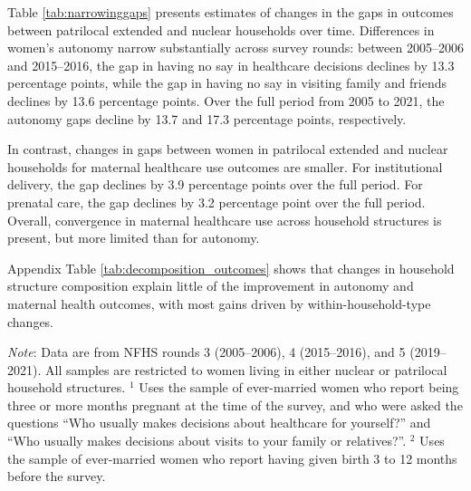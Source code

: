 \documentclass[10pt,twoside,reqno]{article}
\begin{document}
Table \ref{tab:narrowinggaps} presents estimates of changes in the gaps in outcomes between patrilocal extended and nuclear households over time.  Differences in women’s autonomy narrow substantially across survey rounds: between 2005–2006 and 2015–2016, the gap in having no say in healthcare decisions declines by 13.3 percentage points, while the gap in having no say in visiting family and friends declines by 13.6 percentage points. Over the full period from 2005 to 2021, the autonomy gaps decline by 13.7 and 17.3 percentage points, respectively.

In contrast, changes in gaps between women in patrilocal extended and nuclear households for maternal healthcare use outcomes are smaller. For institutional delivery, the gap declines by 3.9 percentage points over the full period. For prenatal care, the gap declines by 3.2 percentage point over the full period. Overall, convergence in maternal healthcare use across household structures is present, but more limited than for autonomy. 

Appendix Table \ref{tab:decomposition_outcomes} shows that changes in household structure composition explain little of the improvement in autonomy and maternal health outcomes, with most gains driven by within-household-type changes. 

\begin{table}[H]
\sansmath
\sffamily
\captionsetup{style=CAPTAB}
\caption{The gap between patrilocal extended and nuclear households in women's autonomy and healthcare use is narrowing over time}
\label{tab:narrowinggaps}
\vspace{-4pt}

\begin{scriptsize}
\setlength{\tabcolsep}{6pt}
\renewcommand{\arraystretch}{1.6}
\centering

\end{scriptsize}

\vspace{1ex}
\small\scriptsize{\textsf{\textit{Note}: Data are from NFHS rounds 3 (2005--2006), 4 (2015--2016), and 5 (2019--2021).}}
\newline\small\scriptsize{\textsf{ All samples are restricted to women living in either nuclear or patrilocal household structures.}}
\newline\small\scriptsize{\textsf{$^1$ Uses the sample of ever-married women who report being three or more months pregnant at the time of the survey, and who were asked the questions ``Who usually makes decisions about healthcare for yourself?'' and ``Who usually makes decisions about visits to your family or relatives?''.}}
\newline\small\scriptsize{\textsf{$^2$ Uses the sample of ever-married women who report having given birth 3 to 12 months before the survey.}}
\end{table}
\end{document}
